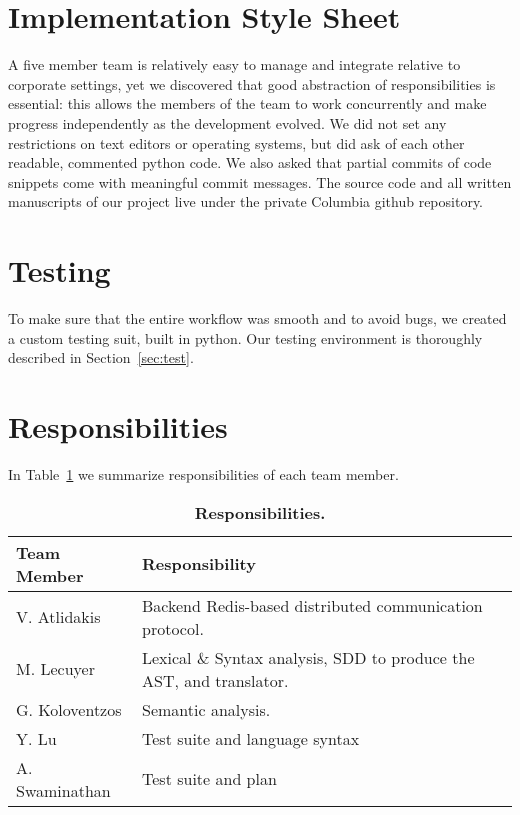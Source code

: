 \section{Implementation Style Sheet}
A five member team is relatively easy to manage and integrate relative to corporate settings, yet we discovered that good abstraction of responsibilities is essential: this allows the members of the team to work concurrently and make progress independently as the development evolved.  We did not set any restrictions on text editors or operating systems, but did ask of each other readable, commented python code. We also asked that partial commits of
code snippets come with meaningful commit messages. The source code and all written manuscripts of our project live under the private Columbia github repository.

\section{Testing}
To make sure that the entire workflow was smooth and to avoid bugs, we created a
custom testing suit, built in python. Our testing environment is thoroughly
described in Section~\ref{sec:test}.

\section{Responsibilities}
In Table~\ref{tab:resp} we summarize responsibilities of each team member.
\begin{table}[!h]
{%
 \begin{center}
    \begin{tabular}{ | l || l |}
    \hline
    \textbf{Team Member} & \textbf{Responsibility} \\
    \hline
    \hline
    V. Atlidakis & Backend Redis-based distributed communication protocol.\\ \hline
    M. Lecuyer & Lexical \& Syntax analysis, SDD to produce the AST, and translator. \\ \hline
    G. Koloventzos & Semantic analysis. \\ \hline
    Y. Lu & Test suite and language syntax \\ \hline
    A. Swaminathan  & Test suite and plan \\ \hline
    \hline
    \end{tabular}
    \caption{\textbf{Responsibilities.}}
    \label{tab:resp}
 \end{center}
}
\end{table}


